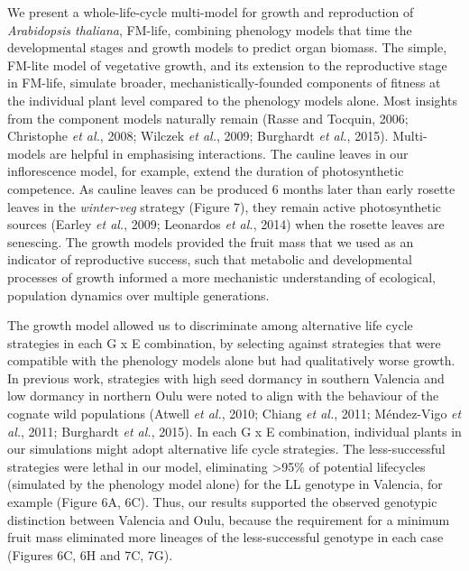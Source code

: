 \documentclass[phd]{infthesis}
\begin{document}
We present a whole-life-cycle multi-model for growth and reproduction of
\emph{Arabidopsis thaliana}, FM-life, combining phenology models that
time the developmental stages and growth models to predict organ
biomass. The simple, FM-lite model of vegetative growth, and its
extension to the reproductive stage in FM-life, simulate broader,
mechanistically-founded components of fitness at the individual plant
level compared to the phenology models alone. Most insights from the
component models naturally remain (Rasse and Tocquin, 2006; Christophe
\emph{et al.}, 2008; Wilczek \emph{et al.}, 2009; Burghardt \emph{et
al.}, 2015). Multi-models are helpful in emphasising interactions. The
cauline leaves in our inflorescence model, for example, extend the
duration of photosynthetic competence. As cauline leaves can be produced
6 months later than early rosette leaves in the \emph{winter-veg}
strategy (Figure 7), they remain active photosynthetic sources (Earley
\emph{et al.}, 2009; Leonardos \emph{et al.}, 2014) when the rosette
leaves are senescing. The growth models provided the fruit mass that we
used as an indicator of reproductive success, such that metabolic and
developmental processes of growth informed a more mechanistic
understanding of ecological, population dynamics over multiple
generations.

The growth model allowed us to discriminate among alternative life cycle
strategies in each G x E combination, by selecting against strategies
that were compatible with the phenology models alone but had
qualitatively worse growth. In previous work, strategies with high seed
dormancy in southern Valencia and low dormancy in northern Oulu were
noted to align with the behaviour of the cognate wild populations
(Atwell \emph{et al.}, 2010; Chiang \emph{et al.}, 2011; Méndez-Vigo
\emph{et al.}, 2011; Burghardt \emph{et al.}, 2015). In each G x E
combination, individual plants in our simulations might adopt
alternative life cycle strategies. The less-successful strategies were
lethal in our model, eliminating \textgreater{}95\% of potential
lifecycles (simulated by the phenology model alone) for the LL genotype
in Valencia, for example (Figure 6A, 6C). Thus, our results supported
the observed genotypic distinction between Valencia and Oulu, because
the requirement for a minimum fruit mass eliminated more lineages of the
less-successful genotype in each case (Figures 6C, 6H and 7C, 7G).
\end{document}
